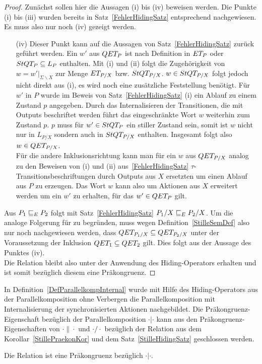 \begin{proof}
  Zunächst sollen hier die Aussagen (i) bis (iv) beweisen werden. Die Punkte
  (i) bis (iii) wurden bereits in Satz~\ref{FehlerHidingSatz} entsprechend
  nachgewiesen. Es muss also nur noch (iv) gezeigt werden.
  \begin{itemize}
    \item[(iv)] Dieser Punkt kann auf die Aussagen von
      Satz~\ref{FehlerHidingSatz} zurück geführt werden. Ein $w'$ aus $QET _P$
      ist nach Definition in $ET _P$ oder $StQT _P \subseteq L_P$ enthalten.
      Mit (i) und (ii) folgt die Zugehörigkeit von $w=w'|_{\Sigma\backslash X}$
      zur Menge $ET _{P/X}$ bzw. $StQT _{P/X}$. $w\in StQT _{P/X}$ folgt
      jedoch nicht direkt aus (i), es wird noch eine zusätzliche Feststellung
      benötigt. Für $w'$ in $P$ wurde im Beweis von Satz~\ref{FehlerHidingSatz}
      (i) ein Ablauf zu einem Zustand $p$ angegeben. Durch das Internalisieren
      der Transitionen, die mit Outputs beschriftet werden führt das
      eingeschränkte Wort $w$ weiterhin zum Zustand $p$. $p$ muss für
      $w'\in StQT _P$ ein stiller Zustand sein, somit ist $w$ nicht nur in $L
      _{P/X}$ sondern auch in $StQT _{P/X}$ enthalten. Insgesamt folgt also
      $w\in QET _{P/X}$.\\
      Für die andere Inklusionsrichtung kann man für ein $w$ aus $QET _{P/X}$
      analog zu den Beweisen von (i) und (ii) aus~\ref{FehlerHidingSatz}
      $\tau$-Transitionsbeschriftungen durch Outputs aus $X$ ersetzten um einen
      Ablauf aus $P$ zu erzeugen. Das Wort $w$ kann also um Aktionen aus $X$
      erweitert werden um ein $w'$ zu erhalten, für das $w'\in QET _P$ gilt.
  \end{itemize}
  Aus $P_1 \sqsubseteq  _E P_2$ folgt mit Satz~\ref{FehlerHidingSatz} $P_1/X \sqsubseteq  _E P_2/X$.
  Um die analoge Folgerung für \QRel{} zu begründen, muss wegen
  Definition~\ref{StilleSemDef} also nur noch nachgewiesen werden, dass $QET
  _{P_1/X} \subseteq QET _{P_2/X}$ unter der Voraussetzung der Inklusion $QET
  _1 \subseteq QET _2$ gilt. Dies folgt aus der Aussage des Punktes (iv).\\
  Die Relation \QRel{} bleibt also unter der Anwendung des Hiding-Operators
  erhalten und ist somit bezüglich diesem eine Präkongruenz.
\end{proof}

In Definition~\ref{DefParallelkompInternal} wurde mit Hilfe des
Hiding-Operators aus der Parallelkomposition ohne Verbergen die
Parallelkomposition mit Internalisierung der synchronisierten Aktionen
nachgebildet. Die Präkongruenz-Eigenschaft bezüglich \QRel{} der
Parallelkomposition $\cdot |\cdot$ kann aus den Präkongruenz-Eigenschaften von
$\cdot\|\cdot$ und $\cdot /\cdot$ bezüglich der Relation \QRel{} aus dem
Korollar~\ref{StillePraekonKor} und dem Satz~\ref{StilleHidingSatz} geschlossen
werden.

\begin{Kor}
  Die Relation \QRel{} ist eine Präkongruenz bezüglich $\cdot |\cdot$.
\end{Kor}

